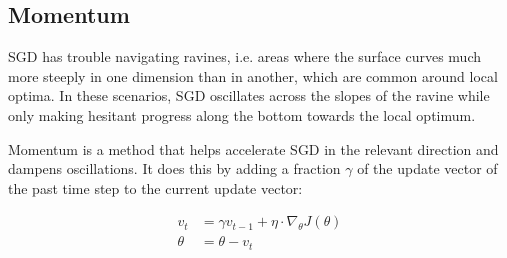 \documentclass{article}
\begin{document}
\subsection{Momentum}

SGD has trouble navigating ravines, i.e. areas where the surface curves much more steeply in one dimension than in another, which are common around local optima. In these scenarios, SGD oscillates across the slopes of the ravine while only making hesitant progress along the bottom towards the local optimum.

Momentum is a method that helps accelerate SGD in the relevant direction and dampens oscillations. It does this by adding a fraction $\gamma$ of the update vector of the past time step to the current update vector:

\begin{align}
v_{t} &=  \gamma  v_{t-1} + \eta \cdot \nabla_\theta J( \theta) \nonumber  \\ 
\theta &= \theta - v_{t} \nonumber 
\end{align}
\end{document}
